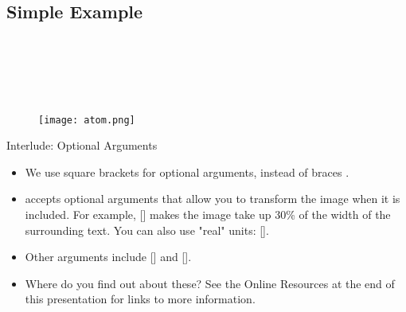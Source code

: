 \documentclass[usenames,dvipsnames]{beamer}
\begin{document}
\subsection{Simple Example}
\begin{frame}[fragile]{\insertsubsection}

\\
\\
\\
\\


\begin{figure}
\centering
\texttt{[image: atom.png]}
\end{figure}

\begin{center}
\end{center}

\end{frame}
\begin{frame}[fragile]{Interlude: Optional Arguments}
\begin{itemize}
\item We use square brackets \keystrokebftt{[} \keystrokebftt{]} for optional
arguments, instead of braces \keystrokebftt{\{} \keystrokebftt{\}}.
\item {} accepts optional arguments that allow you to transform the
image when it is included. For example, [] makes
the image take up 30\% of the width of the surrounding text. You can also use "real" units: [].
\item Other arguments include [] and [].
\item Where do you find out about these? See the Online Resources at the end of this
presentation for links to more information. 
\end{itemize}
\end{frame}
\end{document}
